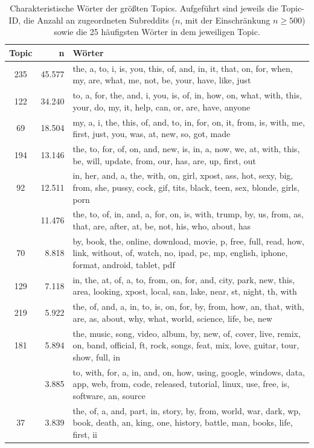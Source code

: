 \documentclass[11pt,a4paper,twoside]{article}
\begin{document}
\begin{longtable}[t]{cr >{\raggedright\arraybackslash}p{}}
\caption{\label{tab:app-top-words-tab}Charakteristische Wörter der größten Topics.
Aufgeführt sind jeweils die Topic-ID, die Anzahl an zugeordneten
Subreddits (\(n\), mit der Einschränkung \(n \ge 500\)) sowie die 25
häufigsten Wörter in dem jeweiligen Topic.}\\
\toprule
Topic & n & Wörter\\
\midrule
235 & 45.577 & the, a, to, i, is, you, this, of, and, in, it, that, on, for, when, my, are, what, me, not, be, your, have, like, just\\
122 & 34.240 & to, a, for, the, and, i, you, is, of, in, how, on, what, with, this, your, do, my, it, help, can, or, are, have, anyone\\
69 & 18.504 & my, a, i, the, this, of, and, to, in, for, on, it, from, is, with, me, first, just, you, was, at, new, so, got, made\\
194 & 13.146 & the, to, for, of, on, and, new, is, in, a, now, we, at, with, this, be, will, update, from, our, has, are, up, first, out\\
92 & 12.511 & in, her, and, a, the, with, on, girl, xpost, ass, hot, sexy, big, from, she, pussy, cock, gif, tits, black, teen, sex, blonde, girls, porn\\
\addlinespace
210 & 11.476 & the, to, of, in, and, a, for, on, is, with, trump, by, us, from, as, that, are, after, at, be, not, his, who, about, has\\
70 & 8.818 & by, book, the, online, download, movie, p, free, full, read, how, link, without, of, watch, no, ipad, pc, mp, english, iphone, format, android, tablet, pdf\\
129 & 7.118 & in, the, at, of, a, to, from, on, for, and, city, park, new, this, area, looking, xpost, local, san, lake, near, st, night, th, with\\
219 & 5.922 & the, of, and, a, in, to, is, on, for, by, from, how, an, that, with, are, as, about, why, what, world, science, life, be, new\\
181 & 5.894 & the, music, song, video, album, by, new, of, cover, live, remix, on, band, official, ft, rock, songs, feat, mix, love, guitar, tour, show, full, in\\
\addlinespace
239 & 3.885 & to, with, for, a, in, and, on, how, using, google, windows, data, app, web, from, code, released, tutorial, linux, use, free, is, software, an, source\\
37 & 3.839 & the, of, a, and, part, in, story, by, from, world, war, dark, wp, book, death, an, king, one, history, battle, man, books, life, first, ii\\

\end{longtable}
\end{document}
